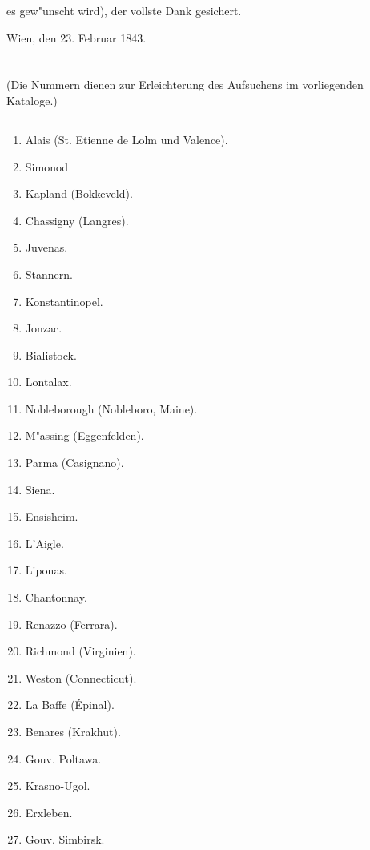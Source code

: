 \documentclass[a4paper, 11pt, oneside, polutonikogreek, german]{article}
\begin{document}
es gew"unscht wird), der vollste Dank gesichert.

Wien, den 23. Februar 1843.
\clearpage
\section{}
\begin{center}
(Die Nummern dienen zur Erleichterung des Aufsuchens im vorliegenden Kataloge.)
\end{center}
\subsection{}
\begin{enumerate}
    \item Alais (St. Etienne de Lolm und Valence).
    \item Simonod
    \item Kapland (Bokkeveld).
    \item Chassigny (Langres).
    \item Juvenas.
    \item Stannern.
    \item Konstantinopel.
    \item Jonzac.
    \item Bialistock.
    \item Lontalax.
    \item Nobleborough (Nobleboro, Maine).
    \item M"assing (Eggenfelden).
    \item Parma (Casignano).
    \item Siena.
    \item Ensisheim.
    \item L'Aigle.
    \item Liponas.
    \item Chantonnay.
    \item Renazzo (Ferrara).
    \item Richmond (Virginien).
    \item Weston (Connecticut).
    \item La Baffe (Épinal).
    \item Benares (Krakhut).
    \item Gouv. Poltawa.
    \item Krasno-Ugol.
    \item Erxleben.
    \item Gouv. Simbirsk.

\end{enumerate}
\end{document}
